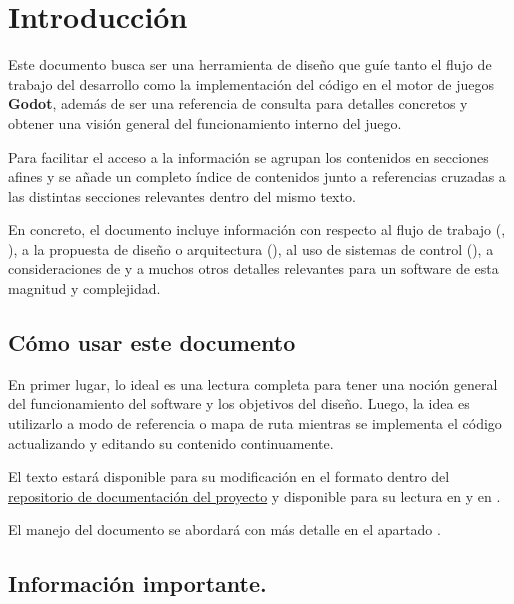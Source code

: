 
\section{Introducción}\label{intro:introduccion}

Este documento busca ser una herramienta de diseño que guíe tanto el flujo de trabajo del desarrollo como la implementación del código en el motor de juegos \textbf{Godot}, además de ser una referencia de consulta para detalles concretos y obtener una visión general del funcionamiento interno del juego.

Para facilitar el acceso a la información se agrupan los contenidos en secciones afines y se añade un completo índice de contenidos junto a referencias cruzadas a las distintas secciones relevantes dentro del mismo texto.

En concreto, el documento incluye información con respecto al flujo de trabajo (, ), a la propuesta de diseño o arquitectura (), al uso de sistemas de control  (), a consideraciones de  y a muchos otros detalles relevantes para un software de esta magnitud y complejidad.

\subsection{Cómo usar este documento}\label{intro:como-usar-el-documento}
En primer lugar, lo ideal es una lectura completa para tener una noción general del funcionamiento del software y los objetivos del diseño. Luego, la idea es utilizarlo a modo de referencia o mapa de ruta mientras se implementa el código actualizando y editando su contenido continuamente.

El texto estará disponible para su modificación en el formato  dentro del \href{https://github.com/polirritmico/Bakumapu-docs}{repositorio de documentación del proyecto} y disponible para su lectura en \href{https://polirritmico.github.io/Bakumapu-docs/}{} y en \href{https://github.com/polirritmico/Bakumapu-docs/blob/main/main.pdf}{}.

El manejo del documento se abordará con más detalle en el apartado .

\subsection{Información importante.}
